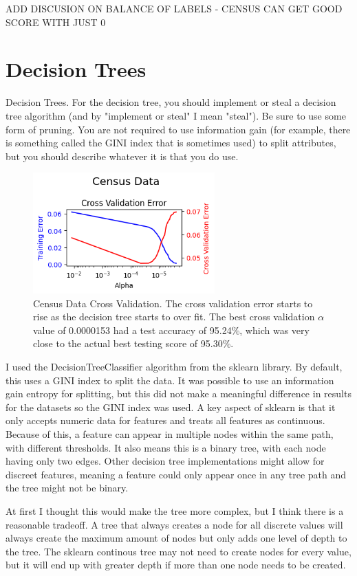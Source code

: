 \documentclass[letterpaper]{article} %
\begin{document}
ADD DISCUSION ON BALANCE OF LABELS - CENSUS CAN GET GOOD SCORE WITH JUST 0

\section{Decision Trees}
Decision Trees. For the decision tree, you should implement or steal a decision tree algorithm (and by "implement or steal" I mean "steal"). Be sure to use some form of pruning. You are not required to use information gain (for example, there is something called the GINI index that is sometimes used) to split attributes, but you should describe whatever it is that you do use.

\begin{figure}[h]
\centering
\includegraphics[width=2.75in]{figures/Census_Data_decision_tree_cross_validation.png}
\caption{Census Data Cross Validation.  The cross validation error starts to rise as the decision tree starts to over fit.  The best cross validation $\alpha$ value of 0.0000153 had a test accuracy of 95.24\%, which was very close to the actual best testing score of 95.30\%. }
\label{fig:census_data_decision_tree_cross_validation}
\end{figure}

I used the DecisionTreeClassifier algorithm from the sklearn library.  By default, this uses a GINI index to split the data.  It was possible to use an information gain entropy for splitting, but this did not make a meaningful difference in results for the datasets so the GINI index was used.  A key aspect of sklearn is that it only accepts numeric data for features and treats all features as continuous.  Because of this, a feature can appear in multiple nodes within the same path, with different thresholds.  It also means this is a binary tree, with each node having only two edges.  Other decision tree implementations might allow for discreet features, meaning a feature could only appear once in any tree path and the tree might not be binary.  

At first I thought this would make the tree more complex, but I think there is a reasonable tradeoff.  A tree that always creates a node for all discrete values will always create the maximum amount of nodes but only adds one level of depth to the tree.  The sklearn continous tree may not need to create nodes for every value, but it will end up with greater depth if more than one node needs to be created.  
\end{document}
